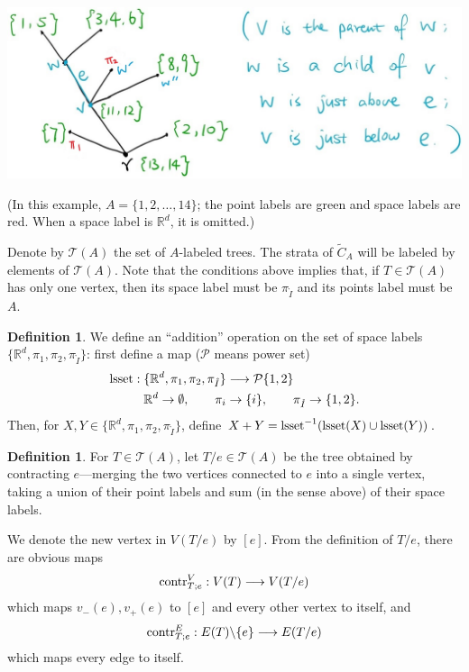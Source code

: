 \documentclass[11pt]{article}
\theoremstyle{definition}
\newtheorem{dfn}[thm]{Definition}
\theoremstyle{remark}
\def\wt#1{\widetilde{#1}}
\def\R{\mathbb{R}}
\def\cT{\mathcal{T}}
\def\rI{{\mathring{I}}}
\def\tn#1{\textnormal{#1}}
\begin{document}
\begin{minipage}{.6\textwidth}
\includegraphics[scale=0.2]{tree_fig}
\end{minipage}
\begin{minipage}{.4\textwidth}
(In this example, $A=\{1,2,\ldots,14\}$; the point labels are green and space labels are red. When a space label is $\R^d$, it is omitted.)
\end{minipage}


Denote by $\cT(A)$ the set of $A$-labeled trees. 
The strata of $\wt{C}_A$ will be labeled by elements of $\cT(A)$. 
Note that the conditions above implies that, if $T\in\cT(A)$ has only one vertex, then its space label must be $\pi_\rI$ and its points label must be $A$. 

\begin{dfn}
We define an ``addition'' operation on the set of space labels $\{\R^d,\pi_1,\pi_2,\pi_\rI\}$: 
first define a map ($\mathcal{P}$ means power set)
\begin{align}
\tn{lsset}:\{\R^d,\pi_1,\pi_2,\pi_\rI\}&\longrightarrow \mathcal{P}\{1,2\}\\
\R^d\to\emptyset,\qquad \pi_i&\to \{i\},\qquad \pi_\rI\to\{1,2\}\nonumber.
\end{align}
Then, for $X,Y\in \{\R^d,\pi_1,\pi_2,\pi_\rI\}$, define $X+Y=\tn{lsset}^{-1}(\tn{lsset}(X)\cup\tn{lsset}(Y))$. 
\end{dfn}

\begin{dfn}
For $T\in\cT(A)$, let $T/e\in\cT(A)$ be the tree obtained by contracting $e$---merging the two vertices connected to $e$ into a single vertex, taking a union of their point labels and sum (in the sense above) of their space labels. 

%

We denote the new vertex in $V(T/e)$ by $[e]$. 
From the definition of $T/e$, there are obvious maps 
$$\tn{contr}^V_{T;e}:V(T)\longrightarrow V(T/e)$$
which maps $v_-(e),v_+(e)$ to $[e]$ and every other vertex to itself, and
$$\tn{contr}^E_{T;e}:E(T)\backslash\{e\}\longrightarrow E(T/e)$$
which maps every edge to itself. 
\end{dfn}
\end{document}
